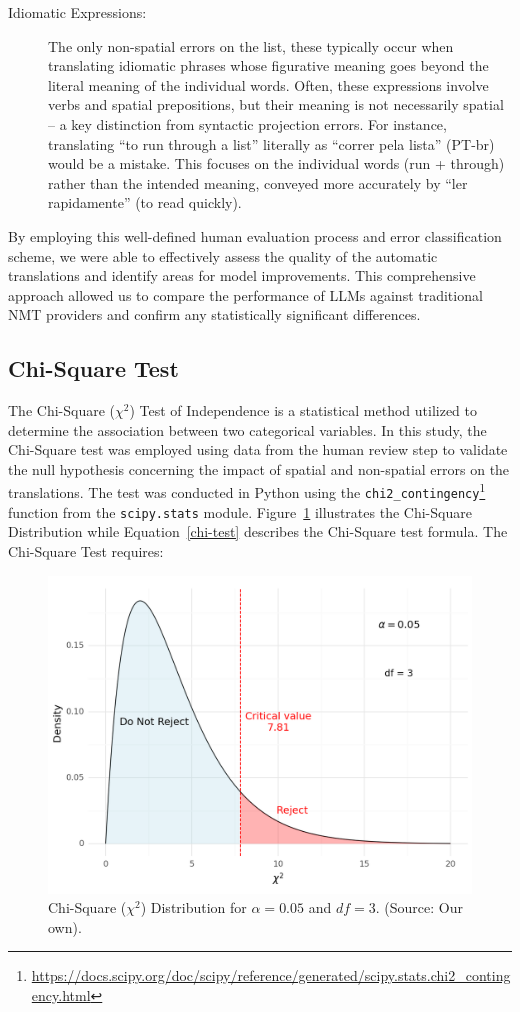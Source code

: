 \begin{description}
    \item[Idiomatic Expressions:] The only non-spatial errors on the list, these typically occur when translating idiomatic phrases whose figurative meaning goes beyond the literal meaning of the individual words. Often, these expressions involve verbs and spatial prepositions, but their meaning is not necessarily spatial -- a key distinction from syntactic projection errors. For instance, translating ``to run through a list'' literally as ``correr pela lista'' (PT-br) would be a mistake. This focuses on the individual words (run + through) rather than the intended meaning, conveyed more accurately by ``ler rapidamente'' (to read quickly).
\end{description}

By employing this well-defined human evaluation process and error classification scheme, we were able to effectively assess the quality of the automatic translations and identify areas for model improvements. This comprehensive approach allowed us to compare the performance of LLMs against traditional NMT providers and confirm any statistically significant differences.


\subsection{Chi-Square Test} 
\label{sec: chi-test}

The Chi-Square ($\chi^2$) Test of Independence is a statistical method utilized to determine the association between two categorical variables. In this study, the Chi-Square test was employed using data from the human review step to validate the null hypothesis concerning the impact of spatial and non-spatial errors on the translations. The test was conducted in Python using the \texttt{chi2\_contingency}\footnote{\href{https://docs.scipy.org/doc/scipy/reference/generated/scipy.stats.chi2\_contingency.html}{https://docs.scipy.org/doc/scipy/reference/generated/scipy.stats.chi2\_contingency.html}} function from the \texttt{scipy.stats} module. Figure~\ref{fig:chi} illustrates the Chi-Square Distribution while Equation~\ref{chi-test} describes the Chi-Square test formula. The Chi-Square Test requires:

\begin{figure}[htb]
\centering
\includegraphics[width=.6\textwidth]{textual/Figuras/Results/chi.png}
\caption{Chi-Square ($\chi^2$) Distribution for $\alpha = 0.05$ and $df = 3$. (Source: Our own).}
\label{fig:chi}
\end{figure}


